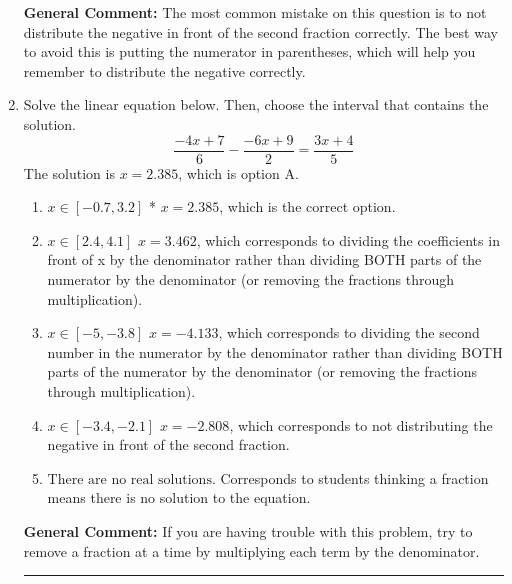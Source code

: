 \documentclass{extbook}[14pt]
\newcommand{\litem}[1]{\item #1

\rule{\textwidth}{0.4pt}}
\begin{document}
\begin{enumerate}
{\textbf{General Comment:} The most common mistake on this question is to not distribute the negative in front of the second fraction correctly. The best way to avoid this is putting the numerator in parentheses, which will help you remember to distribute the negative correctly.
}
\litem{
Solve the linear equation below. Then, choose the interval that contains the solution.
\[ \frac{-4x + 7}{6} - \frac{-6x + 9}{2} = \frac{3x + 4}{5} \]
The solution is \( x = 2.385 \), which is option A.\begin{enumerate}[label=\Alph*.]
\item \( x \in [-0.7, 3.2] \)
* $x = 2.385$, which is the correct option.
\item \( x \in [2.4, 4.1] \)
 $x = 3.462$, which corresponds to dividing the coefficients in front of x by the denominator rather than dividing BOTH parts of the numerator by the denominator (or removing the fractions through multiplication).
\item \( x \in [-5, -3.8] \)
 $x = -4.133$, which corresponds to dividing the second number in the numerator by the denominator rather than dividing BOTH parts of the numerator by the denominator (or removing the fractions through multiplication).
\item \( x \in [-3.4, -2.1] \)
 $x = -2.808$, which corresponds to not distributing the negative in front of the second fraction.
\item \( \text{There are no real solutions.} \)
Corresponds to students thinking a fraction means there is no solution to the equation.
\end{enumerate}

\textbf{General Comment:} If you are having trouble with this problem, try to remove a fraction at a time by multiplying each term by the denominator.
}
\end{enumerate}
\end{document}
